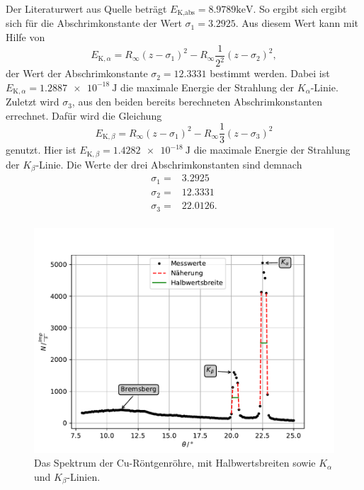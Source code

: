 Der Literaturwert aus Quelle \cite{xray} beträgt $E_\text{K,abs} = 8.9789 \si{\kilo\eV}$. 
So ergibt sich ergibt sich für die Abschrimkonstante der Wert $\sigma_1 = 3.2925$.
Aus diesem Wert kann mit Hilfe von
\begin{equation*}
  E_{\text{K},\alpha} = R_\infty (z-\sigma_1)^2 - R_\infty \frac{1}{2^2}(z-\sigma_2)^2,
\end{equation*}
der Wert der Abschrimkonstante $\sigma_2 = 12.3331$ bestimmt werden.
Dabei ist $E_{\text{K},\alpha} = \SI{1.2887e-18}{\joule}$ die maximale Energie der Strahlung der $K_\alpha$-Linie.
Zuletzt wird $\sigma_3$, aus den beiden bereits berechneten Abschrimkonstanten errechnet.
Dafür wird die Gleichung 
\begin{equation*}
  E_{\text{K},\beta} = R_\infty (z-\sigma_1)^2 - R_\infty \frac{1}{3}(z-\sigma_3)^2
\end{equation*}
genutzt.
Hier ist $E_{\text{K},\beta} = \SI{1.4282e-18}{\joule}$ die maximale Energie der Strahlung der $K_\beta$-Linie.
Die Werte der drei Abschrimkonstanten sind demnach 
\begin{align*}
\sigma_1 =& 3.2925 \\
\sigma_2 =& 12.3331 \\
\sigma_3 =& 22.0126. \\
\end{align*}

\begin{figure}
  \centering
  \includegraphics[width=\textwidth]{content/data/spektrum.pdf}
  \caption{Das Spektrum der Cu-Röntgenröhre, mit Halbwertsbreiten sowie $K_\alpha$ und $K_\beta$-Linien.}
  \label{fig:emis}
\end{figure}

